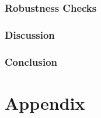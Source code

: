 \documentclass[11pt,letterpaper]{article}
\begin{document}
\section{Robustness Checks}\label{sec:robust}


\section{Discussion}
  
\section{Conclusion}\label{sec:conclusion}

\clearpage	
{\small
	
}	
\clearpage

\appendix 
	\part*{Appendix}\label{app:dix}
	\renewcommand*{\thepage}{A\arabic{page}}
	\renewcommand{\thetable}{A\arabic{table}}
	
\end{document}
